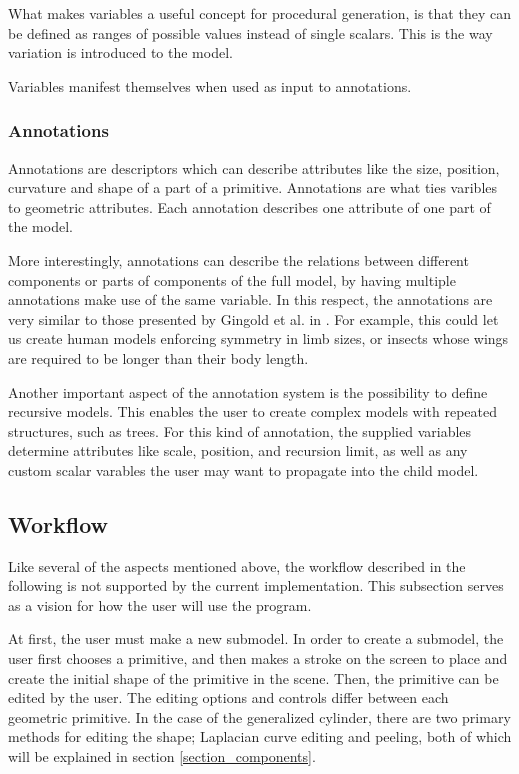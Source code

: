 \documentclass[english]{article}
\begin{document}
What makes variables a useful concept for procedural generation, is that they can be defined as ranges of possible values instead of single scalars. This is the way variation is introduced to the model.

Variables manifest themselves when used as input to annotations. 


\subsubsection{Annotations}

Annotations are descriptors  which can describe attributes like the size, position, curvature and shape of a part of a primitive. Annotations are what ties varibles to geometric attributes. Each annotation describes one attribute of one part of the model.

More interestingly, annotations can describe the relations between different components or parts of components of the full model, by having multiple annotations make use of the same variable. In this respect, the annotations are very similar to those presented by Gingold et al. in \cite{gingold09}. For example, this could let us create human models enforcing symmetry in limb sizes, or insects whose wings are required to be longer than their body length.

Another important aspect of the annotation system is the possibility to define recursive models. This enables the user to create complex models with repeated structures, such as trees. For this kind of annotation, the supplied variables determine attributes like scale, position, and recursion limit, as well as any custom scalar varables the user may want to propagate into the child model.


\subsection{Workflow}

Like several of the aspects mentioned above, the workflow described in the following is not supported by the current implementation. This subsection serves as a vision for how the user will use the program.

At first, the user must make a new submodel.
In order to create a submodel, the user first chooses a primitive, and then makes a stroke on the screen to place and create the initial shape of the primitive in the scene. Then, the primitive can be edited by the user. The editing options and controls differ between each geometric primitive. In the case of the generalized cylinder, there are two primary methods for editing the shape; Laplacian curve editing and peeling, both of which will be explained in section \ref{section_components}.
\end{document}
